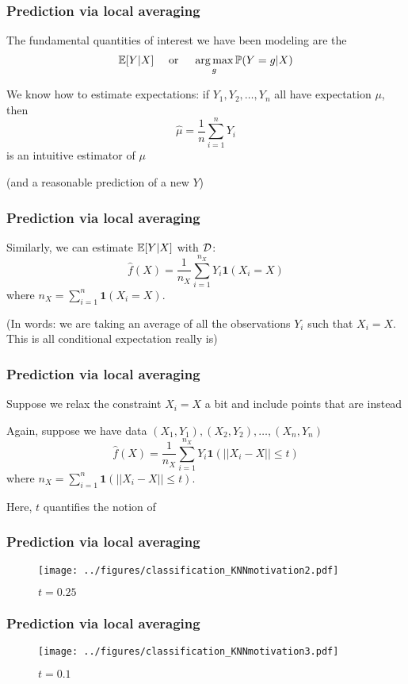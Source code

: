 \documentclass[12pt]{beamer}
\begin{document}
\begin{frame}[fragile]
\frametitle{Prediction via local averaging}
The fundamental quantities of interest we have been modeling are the
\[
\mathbb{E} [Y | X]  \quad \textrm{ or } \quad \operatorname*{arg\,max}_g \mathbb{P}(Y = g | X)
\]

\vsp
We know how to estimate expectations:  if $Y_1,Y_2,\ldots,Y_n$ all have expectation $\mu$, then
\[
\hat\mu = \frac{1}{n}\sum_{i=1}^n Y_i
\]
is an intuitive estimator of $\mu$

{\scriptsize (and a reasonable prediction of a new $Y$)}
\end{frame}

\begin{frame}[fragile]
\frametitle{Prediction via local averaging}
Similarly, we can estimate
$\mathbb{E} [Y | X]$ with $\mathcal{D}$:
\[
\hat f(X) = \frac{1}{n_X}\sum_{i=1}^{n_X} Y_i\mathbf{1}(X_i = X)
\]
where $n_X = \sum_{i=1}^n \mathbf{1}(X_i = X)$.

{\scriptsize (In words: we are taking an average of all the observations $Y_i$ such that $X_i = X$.  This is all conditional expectation
really is)}
\end{frame}

\begin{frame}[fragile]
\frametitle{Prediction via local averaging}

Suppose we relax the constraint $X_i = X$ a bit
and include points that are  instead

\vsp
Again, suppose we have data $(X_1,Y_1), (X_2,Y_2), \ldots, (X_n,Y_n)$
\[
\hat f(X) = \frac{1}{n_X}\sum_{i=1}^{n_X} Y_i\mathbf{1}( ||X_i - X|| \leq t)
\]
where $n_X = \sum_{i=1}^n \mathbf{1}( ||X_i - X|| \leq t)$.

\vsp
Here, $t$ quantifies the notion of 

\end{frame}


\begin{frame}[fragile]
\frametitle{Prediction via local averaging}
\begin{figure}
\centering
\texttt{[image: ../figures/classification\_KNNmotivation2.pdf]}
\caption{$t = 0.25$}
\end{figure}
\end{frame}

\begin{frame}[fragile]
\frametitle{Prediction via local averaging}
\begin{figure}
\centering
\texttt{[image: ../figures/classification\_KNNmotivation3.pdf]}
\caption{$t = 0.1$}
\end{figure}
\end{frame}
\end{document}
